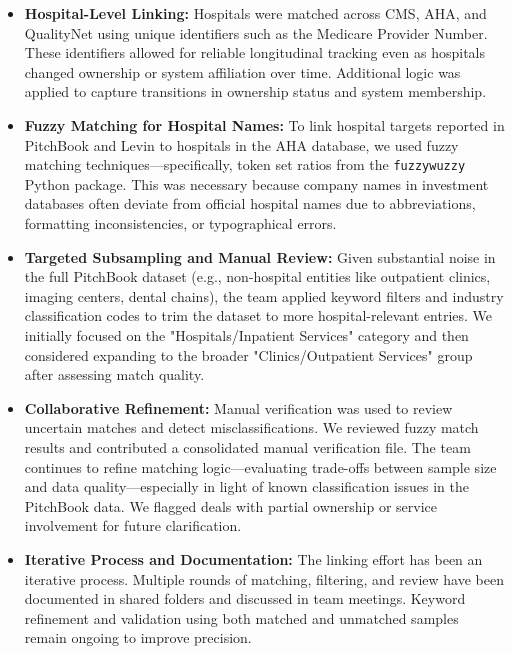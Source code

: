 \documentclass[11pt]{article}
\begin{document}
\begin{itemize}
\item \textbf{Hospital-Level Linking:} Hospitals were matched across CMS, AHA, and QualityNet using unique identifiers such as the Medicare Provider Number. These identifiers allowed for reliable longitudinal tracking even as hospitals changed ownership or system affiliation over time. Additional logic was applied to capture transitions in ownership status and system membership.

\item \textbf{Fuzzy Matching for Hospital Names:} To link hospital targets reported in PitchBook and Levin to hospitals in the AHA database, we used fuzzy matching techniques—specifically, token set ratios from the \texttt{fuzzywuzzy} Python package. This was necessary because company names in investment databases often deviate from official hospital names due to abbreviations, formatting inconsistencies, or typographical errors.

\item \textbf{Targeted Subsampling and Manual Review:} Given substantial noise in the full PitchBook dataset (e.g., non-hospital entities like outpatient clinics, imaging centers, dental chains), the team applied keyword filters and industry classification codes to trim the dataset to more hospital-relevant entries. We initially focused on the "Hospitals/Inpatient Services" category and then considered expanding to the broader "Clinics/Outpatient Services" group after assessing match quality.

\item \textbf{Collaborative Refinement:} Manual verification was used to review uncertain matches and detect misclassifications. We reviewed fuzzy match results and contributed a consolidated manual verification file. The team continues to refine matching logic—evaluating trade-offs between sample size and data quality—especially in light of known classification issues in the PitchBook data. We flagged deals with partial ownership or service involvement for future clarification.

\item \textbf{Iterative Process and Documentation:} The linking effort has been an iterative process. Multiple rounds of matching, filtering, and review have been documented in shared folders and discussed in team meetings. Keyword refinement and validation using both matched and unmatched samples remain ongoing to improve precision.
\end{itemize}
\end{document}
